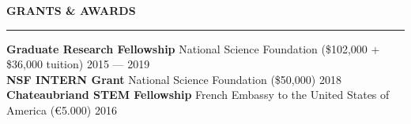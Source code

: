 \documentclass{resume} %
\begin{document}




\vspace{.25cm}

\begin{minipage}{\textwidth}

\sectionskip
\MakeUppercase{\textbf{Grants \& Awards}}
  \sectionlineskip
  \hrule

\vspace{.5cm}




{\bf Graduate Research Fellowship} \hfill {\footnotesize National Science Foundation (\$102,000 + \$36,000 tuition)} \hfill  {2015 --- 2019} \\


{\bf NSF INTERN Grant} \hfill {\footnotesize National Science Foundation (\${50,000})} \hfill {2018} \\ 


{\bf Chateaubriand STEM Fellowship} \hfill {\footnotesize French Embassy to the United States of America (\euro{5.000}) } \hfill {2016} \\


\end{minipage}
\end{document}
